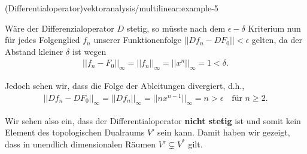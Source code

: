 \documentclass[letterpaper,10pt,german]{jupyterBook}
\begin{document}
\begin{example}{(Differentialoperator)}{vektoranalysis/multilinear:example-5}
\par
Wäre der Differenzialoperator \(D\) stetig, so müsste nach dem \(\epsilon-\delta\) Kriterium nun für jedes Folgenglied \(f_n\) unserer Funktionenfolge \(||Df_n - DF_0|| < \epsilon\) gelten, da der Abstand kleiner \(\delta\) ist wegen
\begin{align*}
||f_n - F_0||_\infty = ||f_n||_\infty = ||x^n||_\infty = 1 < \delta.
\end{align*}
\par
Jedoch sehen wir, dass die Folge der Ableitungen divergiert, d.h.,
\begin{align*}
||Df_n - DF_0||_\infty = ||Df_n||_\infty = ||nx^{n-1}||_\infty = n > \epsilon \quad \text{für } n\geq 2.
\end{align*}
\par
Wir sehen also ein, dass der Differentialoperator \textbf{nicht stetig} ist und somit kein Element des topologischen Dualraums \(V'\) sein kann.
Damit haben wir gezeigt, dass in unendlich dimensionalen Räumen \(V' \subsetneq V^\ast\) gilt.
\end{example}
\end{document}
